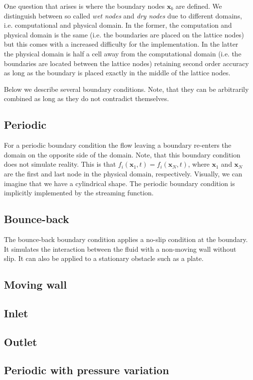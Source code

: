 \documentclass[a4paper,11pt, footsepline]{book}
\begin{document}
One question that arises is where the boundary nodes $\mathbf{x}_b$ are defined. We distinguish between so called \textit{wet nodes} and \textit{dry nodes} due to different domains, i.e. computational and physical domain. In the former, the computation and physical domain is the same (i.e. the boundaries are placed on the lattice nodes) but this comes with a increased difficulty for the implementation. In the latter the physical domain is half a cell away from the computational domain (i.e. the boundaries are located between the lattice nodes) retaining second order accuracy as long as the boundary is placed exactly in the middle of the lattice nodes.

Below we describe several boundary conditions. Note, that they can be arbitrarily combined as long as they do not contradict themselves.
\subsection*{Periodic}
For a periodic boundary condition the flow leaving a boundary re-enters the domain on the opposite side of the domain. Note, that this boundary condition does not simulate reality. This is that $f_{i}(\mathbf{x}_{1},t)=f_{i}(\mathbf{x}_{N},t)$, where $\mathbf{x}_{1}$ and $\mathbf{x}_{N}$ are the first and last node in the physical domain, respectively. Visually, we can imagine that we have a cylindrical shape.
The periodic boundary condition is implicitly implemented by the streaming function.
\subsection*{Bounce-back}
The bounce-back boundary condition applies a no-slip condition at the boundary. It simulates the interaction between the fluid with a non-moving wall without slip. It can also be applied to a stationary obstacle such as a plate.
\subsection*{Moving wall}
\subsection*{Inlet}
\subsection*{Outlet}
\subsection*{Periodic with pressure variation}
\end{document}
